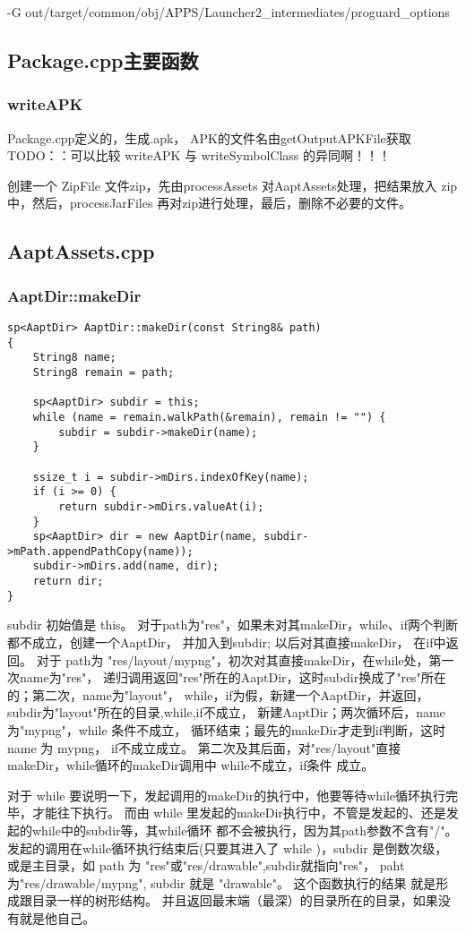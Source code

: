 \documentclass[a4paper,11pt]{article}
\begin{document}
-G out/target/common/obj/APPS/Launcher2_intermediates/proguard_options

\subsection{Package.cpp主要函数}
\subsubsection{writeAPK}
Package.cpp定义的，生成.apk， APK的文件名由getOutputAPKFile获取
TODO：：可以比较 writeAPK 与 writeSymbolClass 的异同啊！！！

创建一个 ZipFile  文件zip，先由processAssets 对AaptAssets处理，把结果放入
zip中，然后，processJarFiles 再对zip进行处理，最后，删除不必要的文件。

\subsection{AaptAssets.cpp}
\subsubsection{AaptDir::makeDir}
\begin{lstlisting}
sp<AaptDir> AaptDir::makeDir(const String8& path)
{
    String8 name;
    String8 remain = path;

    sp<AaptDir> subdir = this;
    while (name = remain.walkPath(&remain), remain != "") {
        subdir = subdir->makeDir(name);
    }

    ssize_t i = subdir->mDirs.indexOfKey(name);
    if (i >= 0) {
        return subdir->mDirs.valueAt(i);
    }
    sp<AaptDir> dir = new AaptDir(name, subdir->mPath.appendPathCopy(name));
    subdir->mDirs.add(name, dir);
    return dir;
}
\end{lstlisting}
subdir 初始值是 this。
对于path为"res"，如果未对其makeDir，while、if两个判断都不成立，创建一个AaptDir，
并加入到subdir; 以后对其直接makeDir， 在if中返回。 对于 path为 "res/layout/mypng"，初次对其直接makeDir，在while处，第一次name为"res"，
递归调用返回"res"所在的AaptDir，这时subdir换成了"res"所在的；第二次，name为"layout"，
while，if为假，新建一个AaptDir，并返回，subdir为"layout"所在的目录,while,if不成立，
新建AaptDir；两次循环后，name为"mypng"，while 条件不成立，
循环结束；最先的makeDir才走到if判断，这时 name 为 mypng， if不成立成立。 
第二次及其后面，对"res/layout"直接makeDir，while循环的makeDir调用中 while不成立，if条件
成立。

对于 while 要说明一下，发起调用的makeDir的执行中，他要等待while循环执行完毕，才能往下执行。
而由 while 里发起的makeDir执行中，不管是发起的、还是发起的while中的subdir等，其while循环
都不会被执行，因为其path参数不含有"/"。 发起的调用在while循环执行结束后(只要其进入了
while )，subdir 是倒数次级，或是主目录，如 path 为 "res"或"res/drawable",subdir就指向"res"， 
paht为"res/drawable/mypng", subdir 就是 "drawable"。 这个函数执行的结果
就是形成跟目录一样的树形结构。 并且返回最末端（最深）的目录所在的目录，如果没有就是他自己。
\end{document}
